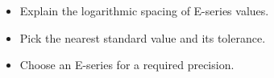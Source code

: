 \begin{objectives}
\begin{itemize}[leftmargin=1.4em,itemsep=2pt]
\item Explain the logarithmic spacing of E-series values.
\item Pick the nearest standard value and its tolerance.
\item Choose an E-series for a required precision.
\end{itemize}
\end{objectives}

